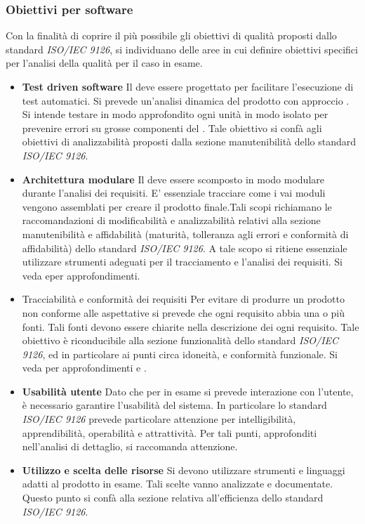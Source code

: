 \documentclass[12pt,a4paper]{article}
\begin{document}
\subsubsection{Obiettivi per software}
Con la finalità di coprire il più possibile gli obiettivi di qualità proposti dallo standard  \textit{ISO/IEC 9126}, si individuano delle aree in cui definire obiettivi specifici per l'analisi della qualità  per il caso in esame.
\begin{itemize}
	\item{\textbf{Test driven software}}
	Il  deve essere progettato per facilitare l'esecuzione di test automatici. Si prevede un'analisi dinamica del prodotto con approccio . Si intende testare in modo approfondito ogni unità  in modo isolato per prevenire errori su grosse componenti del . Tale obiettivo si confà agli obiettivi di analizzabilità proposti dalla sezione manutenibilità dello standard \textit{ISO/IEC 9126}.
	\item{\textbf{Architettura modulare}}
	Il  deve essere scomposto in modo modulare durante l'analisi dei requisiti. E' essenziale tracciare come i vai moduli vengono assemblati per creare il prodotto finale.Tali scopi richiamano le raccomandazioni di modificabilità e analizzabilità relativi alla sezione manutenibilità e affidabilità (maturità, tolleranza agli errori e conformità di affidabilità) dello standard \textit{ISO/IEC 9126}. A tale scopo si ritiene essenziale utilizzare strumenti adeguati per il tracciamento e l'analisi dei requisiti. Si veda \NdP e\AdR per approfondimenti.
	\item{Tracciabilità e conformità dei requisiti}
	Per evitare di produrre un prodotto non conforme alle aspettative si prevede che ogni requisito  abbia una o più fonti. Tali fonti devono essere chiarite nella descrizione dei ogni requisito. Tale obiettivo è riconducibile alla sezione funzionalità dello standard  \textit{ISO/IEC 9126}, ed in particolare ai punti circa idoneità, e conformità funzionale. Si veda per approfondimenti \NdP e \AdR.
	\item{\textbf{Usabilità utente}}
	Dato che per  in esame si prevede interazione con l'utente, è necessario garantire l'usabilità del sistema. In particolare lo standard \textit{ISO/IEC 9126} prevede particolare attenzione per intelligibilità, apprendibilità, operabilità e attrattività. Per tali punti, approfonditi nell'analisi di dettaglio, si raccomanda attenzione.
	\item{\textbf{Utilizzo e scelta delle risorse}}
	Si devono utilizzare strumenti e linguaggi adatti al prodotto in esame. Tali scelte vanno analizzate e documentate. Questo punto si confà alla sezione relativa all'efficienza dello standard \textit{ISO/IEC 9126}.
\end{itemize}
\end{document}

